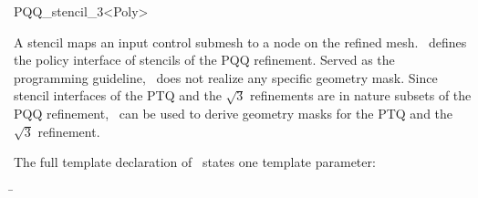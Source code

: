 
\ccRefPageBegin



\begin{ccRefClass}{PQQ_stencil_3<Poly>}

\ccDefinition

A stencil maps an input control submesh to a node on the refined 
mesh. \ccClassTemplateName\ defines the policy interface of 
stencils of the PQQ refinement. Served as the programming guideline,
\ccClassTemplateName\ does not realize any specific geometry mask.
Since stencil interfaces of the PTQ and the $\sqrt{3}$ refinements are
in nature subsets of the PQQ refinement, \ccClassTemplateName\ can 
be used to derive geometry masks for the PTQ and the $\sqrt{3}$ refinement.




\ccParameters

The full template declaration of \ccClassTemplateName\ states one
template parameter:

\begin{tabbing}
 \= 
\end{tabbing}
   

\end{ccRefClass}

